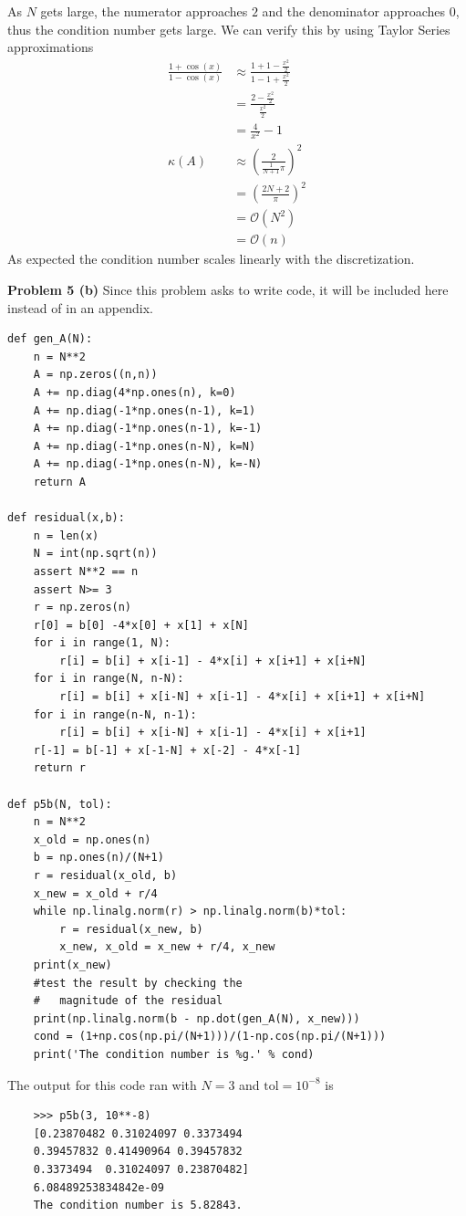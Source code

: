 \documentclass[12pt]{article}
\newcommand{\problem}[1]{\hspace{-4 ex} \large \textbf{Problem #1} }
\begin{document}
As $N$ gets large, the numerator approaches $2$ and the denominator approaches $0$, thus the condition number gets large. We can verify this by using Taylor Series approximations
\begin{align*}
	\frac{1 + \cos(x)}{ 1 - \cos(x)} & \approx \frac{1 + 1 - \frac{x^2}{2}}{1 - 1 + \frac{x^2}{2}} \\
	& = \frac{2 - \frac{x^2}{2}}{\frac{x^2}{2}} \\
	& = \frac{4}{x^2} - 1 \\
	\kappa(A) & \approx \left( \frac{2}{\frac{1}{N+1}\pi} \right)^2 \\
	& = \left( \frac{2N + 2}{\pi} \right)^2 \\
	& = \mathcal{O}(N^2) \\
	& = \mathcal{O}(n)
\end{align*}
As expected the condition number scales linearly with the discretization.

\problem{5 (b)} Since this problem asks to write code, it will be included here instead of in an appendix.
\begin{lstlisting}
def gen_A(N):
	n = N**2
	A = np.zeros((n,n))
	A += np.diag(4*np.ones(n), k=0)
	A += np.diag(-1*np.ones(n-1), k=1)
	A += np.diag(-1*np.ones(n-1), k=-1)
	A += np.diag(-1*np.ones(n-N), k=N)
	A += np.diag(-1*np.ones(n-N), k=-N)
	return A

def residual(x,b):
	n = len(x)
	N = int(np.sqrt(n))
	assert N**2 == n
	assert N>= 3
	r = np.zeros(n)
	r[0] = b[0] -4*x[0] + x[1] + x[N]
	for i in range(1, N):
		r[i] = b[i] + x[i-1] - 4*x[i] + x[i+1] + x[i+N]
	for i in range(N, n-N):
		r[i] = b[i] + x[i-N] + x[i-1] - 4*x[i] + x[i+1] + x[i+N]
	for i in range(n-N, n-1):
		r[i] = b[i] + x[i-N] + x[i-1] - 4*x[i] + x[i+1]
	r[-1] = b[-1] + x[-1-N] + x[-2] - 4*x[-1]
	return r

def p5b(N, tol):
	n = N**2
	x_old = np.ones(n)
	b = np.ones(n)/(N+1)
	r = residual(x_old, b)
	x_new = x_old + r/4
	while np.linalg.norm(r) > np.linalg.norm(b)*tol:
		r = residual(x_new, b)
		x_new, x_old = x_new + r/4, x_new
	print(x_new)
	#test the result by checking the 
	#	magnitude of the residual
	print(np.linalg.norm(b - np.dot(gen_A(N), x_new)))
	cond = (1+np.cos(np.pi/(N+1)))/(1-np.cos(np.pi/(N+1)))
	print('The condition number is %g.' % cond)
\end{lstlisting}

The output for this code ran with $N = 3$ and $\text{tol} = 10^{-8}$ is
\begin{lstlisting}
	>>> p5b(3, 10**-8)
	[0.23870482 0.31024097 0.3373494  
	0.39457832 0.41490964 0.39457832 
	0.3373494  0.31024097 0.23870482]
	6.08489253834842e-09
	The condition number is 5.82843.
\end{lstlisting}
\end{document}

